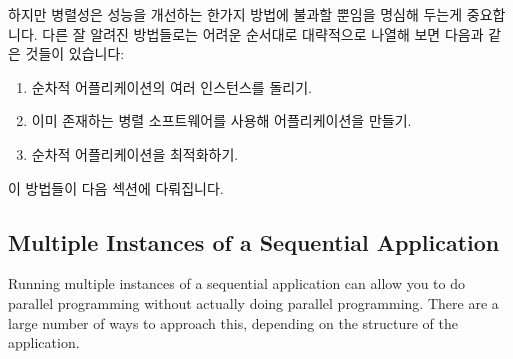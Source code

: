 하지만 병렬성은 성능을 개선하는 한가지 방법에 불과할 뿐임을 명심해 두는게
중요합니다.
다른 잘 알려진 방법들로는 어려운 순서대로 대략적으로 나열해 보면 다음과 같은
것들이 있습니다:

\begin{enumerate}
\item	순차적 어플리케이션의 여러 인스턴스를 돌리기.
\item	이미 존재하는 병렬 소프트웨어를 사용해 어플리케이션을 만들기.
\item	순차적 어플리케이션을 최적화하기.

\end{enumerate}

이 방법들이 다음 섹션에 다뤄집니다.

\subsection{Multiple Instances of a Sequential Application}
\label{sec:intro:Multiple Instances of a Sequential Application}

Running multiple instances of a sequential application can allow you
to do parallel programming without actually doing parallel programming.
There are a large number of ways to approach this, depending on the
structure of the application.

